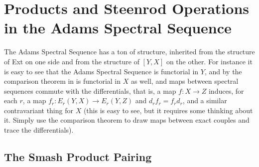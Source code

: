 \section{Products and Steenrod Operations in the Adams Spectral Sequence}

The Adams Spectral Sequence has a ton of structure, inherited from the structure of Ext on one side and from the structure of $[Y,X]$ on the other.
For instance it is easy to see that the Adams Spectral Sequence is functorial in $Y$, and by the comparison theorem in is functorial in $X$ as well,
and maps between spectral sequences commute with the differentials, that is, a map $f:X\to Z$ induces, for each $r$, a map $f_r :E_r(Y,X)\to E_r(Y,Z)$ and $d_rf_r=f_rd_r$, and a similar contravariant thing for $X$ (this is easy to see, but it requires some thinking about it.  Simply use the comparison theorem to draw maps between exact couples and trace the differentials).  

\subsection{The Smash Product Pairing}

